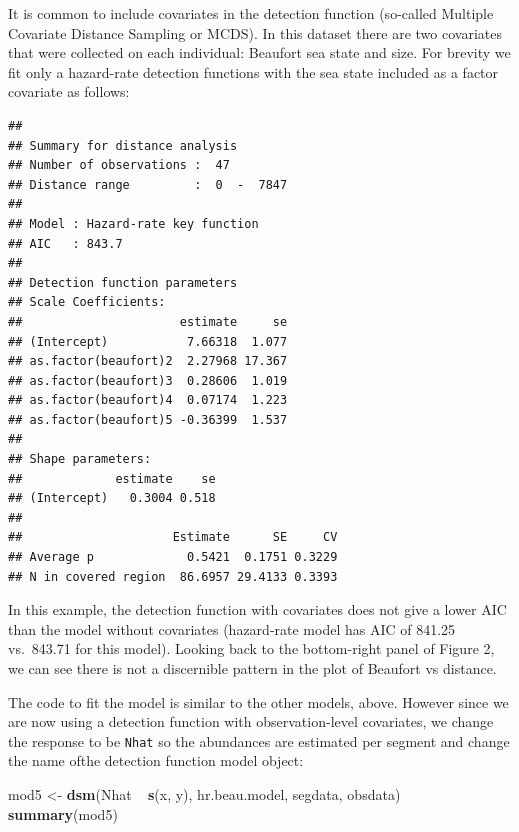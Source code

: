 \documentclass[]{amsart}
\newenvironment{Shaded}{}{}
\newcommand{\KeywordTok}[1]{\textcolor[rgb]{0.00,0.44,0.13}{\textbf{{#1}}}}
\newcommand{\DataTypeTok}[1]{\textcolor[rgb]{0.56,0.13,0.00}{{#1}}}
\newcommand{\StringTok}[1]{\textcolor[rgb]{0.25,0.44,0.63}{{#1}}}
\newcommand{\OtherTok}[1]{\textcolor[rgb]{0.00,0.44,0.13}{{#1}}}
\newcommand{\NormalTok}[1]{{#1}}
\begin{document}
It is common to include covariates in the detection function (so-called
Multiple Covariate Distance Sampling or MCDS). In this dataset there are
two covariates that were collected on each individual: Beaufort sea
state and size. For brevity we fit only a hazard-rate detection
functions with the sea state included as a factor covariate as follows:

\begin{Shaded}
\end{Shaded}

\begin{verbatim}
## 
## Summary for distance analysis 
## Number of observations :  47 
## Distance range         :  0  -  7847 
## 
## Model : Hazard-rate key function 
## AIC   : 843.7 
## 
## Detection function parameters
## Scale Coefficients:  
##                      estimate     se
## (Intercept)           7.66318  1.077
## as.factor(beaufort)2  2.27968 17.367
## as.factor(beaufort)3  0.28606  1.019
## as.factor(beaufort)4  0.07174  1.223
## as.factor(beaufort)5 -0.36399  1.537
## 
## Shape parameters:  
##             estimate    se
## (Intercept)   0.3004 0.518
## 
##                     Estimate      SE     CV
## Average p             0.5421  0.1751 0.3229
## N in covered region  86.6957 29.4133 0.3393
\end{verbatim}

In this example, the detection function with covariates does not give a
lower AIC than the model without covariates (hazard-rate model has AIC
of 841.25 vs.~843.71 for this model). Looking back to the bottom-right
panel of Figure 2, we can see there is not a discernible pattern in the
plot of Beaufort vs distance.

The code to fit the model is similar to the other models, above. However
since we are now using a detection function with observation-level
covariates, we change the response to be \texttt{Nhat} so the abundances
are estimated per segment and change the name ofthe detection function
model object:

\begin{Shaded}
\begin{Highlighting}[]
\NormalTok{mod5 <-}\StringTok{ }\KeywordTok{dsm}\NormalTok{(Nhat ~}\StringTok{ }\KeywordTok{s}\NormalTok{(x, y), hr.beau.model, segdata, obsdata)}
\KeywordTok{summary}\NormalTok{(mod5)}
\end{Highlighting}
\end{Shaded}
\end{document}
